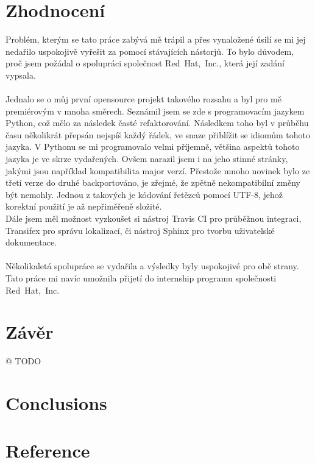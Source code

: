 \documentclass[10pt,a4paper]{article}
\begin{document}
	\section{Zhodnocení}
	Problém, kterým se tato práce zabývá mě trápil a přes vynaložené úsilí se mi jej nedařilo uspokojivě vyřešit za pomocí stávajících nástorjů. To bylo důvodem, proč jsem požádal o spolupráci společnost Red~Hat,~Inc., která její zadání vypsala.
	\\
	\\
	Jednalo se o můj první opensource projekt takového rozsahu a byl pro mě premiérovým v mnoha směrech. Seznámil jsem se zde s programovacím jazykem Python, což mělo za následek časté refaktorování. Následkem toho byl v průběhu času několikrát přepsán nejspíš každý řádek, ve snaze přiblížit se idiomům tohoto jazyka. V Pythonu se mi programovalo velmi příjemně, většina aspektů tohoto jazyka je ve skrze vydařených. Ovšem narazil jsem i na jeho stinné stránky, jakými jsou například kompatibilita major verzí. Přestože mnoho novinek bylo ze třetí verze do druhé backportováno, je zřejmé, že zpětně nekompatibilní změny být nemohly. Jednou z takových je kódování řetězců pomocí UTF-8, jehož korektní použití je až nepřiměřeně složité.
	\\
	Dále jsem měl možnost vyzkoušet si nástroj Travis CI pro průběžnou integraci, Transifex pro správu lokalizací, či nástroj Sphinx pro tvorbu uživatelské dokumentace.
	\\
	\\
	Několikaletá spolupráce se vydařila a výsledky byly uspokojivé pro obě strany. Tato práce mi navíc umožnila přijetí do internship programu společnosti Red~Hat,~Inc.

	\section{Závěr} %
	@ TODO

	\section{Conclusions} %

	\section{Reference} %

\end{document}
